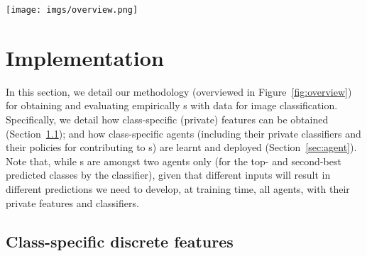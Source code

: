 \begin{figure*}
    \centering
    \texttt{[image: imgs/overview.png]}
    \caption{Overview of our implementation (argument dependencies are temporal).}
    \label{fig:overview}
\end{figure*}

\section{%
Implementation}
\label{sec:set-up}

In this section, we detail our methodology (overviewed in Figure~\ref{fig:overview}) for obtaining and  evaluating empirically \FAXIC s %
with data for image classification.
Specifically, we detail 
how class-specific (private) features  can be obtained (Section~\ref{sec:feat}); and how class-specific agents (including their private classifiers and their policies for contributing to \FAXIC s) are learnt and deployed (Section~\ref{sec:agent}).
Note that, while \FAXIC s are amongst two agents only (for the top- and second-best predicted classes by the classifier), given that different inputs will result in different predictions we need to develop, at training time, all agents, with their private features and classifiers. 

\subsection{%
Class-specific discrete features}
\label{sec:feat}


